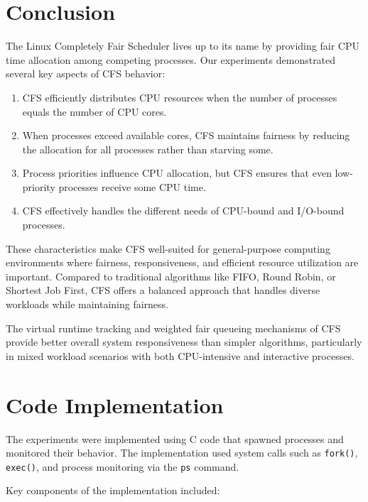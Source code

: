 \documentclass[12pt,a4paper]{article}
\begin{document}
\section{Conclusion}

The Linux Completely Fair Scheduler lives up to its name by providing fair CPU time allocation among competing processes. Our experiments demonstrated several key aspects of CFS behavior:

\begin{enumerate}
    \item CFS efficiently distributes CPU resources when the number of processes equals the number of CPU cores.
    
    \item When processes exceed available cores, CFS maintains fairness by reducing the allocation for all processes rather than starving some.
    
    \item Process priorities influence CPU allocation, but CFS ensures that even low-priority processes receive some CPU time.
    
    \item CFS effectively handles the different needs of CPU-bound and I/O-bound processes.
\end{enumerate}

These characteristics make CFS well-suited for general-purpose computing environments where fairness, responsiveness, and efficient resource utilization are important. Compared to traditional algorithms like FIFO, Round Robin, or Shortest Job First, CFS offers a balanced approach that handles diverse workloads while maintaining fairness.

The virtual runtime tracking and weighted fair queueing mechanisms of CFS provide better overall system responsiveness than simpler algorithms, particularly in mixed workload scenarios with both CPU-intensive and interactive processes.

\appendix
\section{Code Implementation}

The experiments were implemented using C code that spawned processes and monitored their behavior. The implementation used system calls such as \texttt{fork()}, \texttt{exec()}, and process monitoring via the \texttt{ps} command.

Key components of the implementation included:
\end{document}
